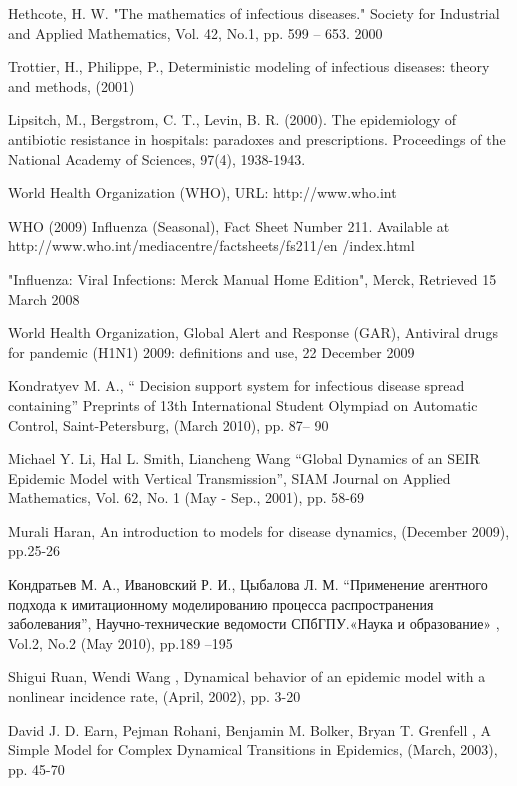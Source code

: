 \begin{thebibliography}{99}

Hethcote, H. W. "The mathematics of infectious diseases." Society for Industrial and Applied Mathematics, Vol. 42, No.1, pp. 599 – 653. 2000

Trottier, H., Philippe, P., Deterministic modeling of infectious diseases: theory and methods, (2001)

Lipsitch, M., Bergstrom, C. T., Levin, B. R. (2000). The epidemiology of antibiotic resistance in hospitals: paradoxes and prescriptions. Proceedings of the National Academy of Sciences, 97(4), 1938-1943.

World Health Organization (WHO), URL: http://www.who.int

WHO (2009) Influenza (Seasonal), Fact Sheet Number 211. Available at http://www.who.int/mediacentre/factsheets/fs211/en /index.html

"Influenza: Viral Infections: Merck Manual Home Edition", Merck, Retrieved 15 March 2008

World Health Organization, Global Alert and Response (GAR), Antiviral drugs for pandemic (H1N1) 2009: definitions and use, 22 December 2009

Kondratyev M.  A., “ Decision support system for infectious disease spread containing” Preprints of 13th International Student Olympiad on Automatic Control, Saint-Petersburg, (March 2010), pp. 87– 90

Michael Y. Li, Hal L. Smith, Liancheng Wang “Global Dynamics of an SEIR Epidemic Model with Vertical Transmission”, SIAM Journal on Applied Mathematics, Vol. 62, No. 1 (May - Sep., 2001), pp. 58-69

Murali Haran, An introduction to models for disease dynamics, (December 2009), pp.25-26

Кондратьев  М.   А.,  Ивановский  Р.  И.,  Цыбалова  Л.  М.  “Применение  агентного  подхода  к  имитационному моделированию  процесса  распространения  заболевания”, Научно-технические  ведомости  СПбГПУ.«Наука  и образование» , Vol.2, No.2 (May 2010), pp.189 –195

Shigui Ruan, Wendi Wang , Dynamical behavior of an epidemic model with a nonlinear incidence rate, (April, 2002), pp. 3-20

David J. D. Earn, Pejman Rohani, Benjamin M. Bolker, Bryan T. Grenfell , A Simple Model for Complex Dynamical Transitions in Epidemics, (March, 2003), pp. 45-70


\end{thebibliography}

